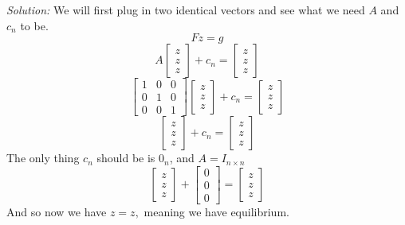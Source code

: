 \documentclass{article}
\newenvironment{solution}
    {\textit{Solution:}}
    {}
\begin{document}
\begin{solution}
We will first plug in two identical vectors and see what we need $A$ and $c_n$ to be. $$Fz = g$$ $$A\begin{bmatrix} z \\ z \\ z \end{bmatrix} + c_n = \begin{bmatrix} z \\ z \\ z \end{bmatrix}$$ $$\begin{bmatrix} 1 & 0 & 0 \\ 0 & 1 & 0 \\ 0 & 0 & 1 \end{bmatrix}\begin{bmatrix} z \\ z \\ z \end{bmatrix} + c_n = \begin{bmatrix} z \\ z \\ z \end{bmatrix}$$ $$\begin{bmatrix} z \\ z \\ z \end{bmatrix} + c_n = \begin{bmatrix} z \\ z \\ z \end{bmatrix}$$ 
The only thing $c_n$ should be is $0_n$, and $A = I_{n\times n}$ $$\begin{bmatrix} z \\ z \\ z \end{bmatrix} + \begin{bmatrix} 0 \\ 0 \\ 0 \end{bmatrix} = \begin{bmatrix} z \\ z \\ z \end{bmatrix}$$ And so now we have $z = z,$ meaning we have equilibrium.
\end{solution}
\end{document}
